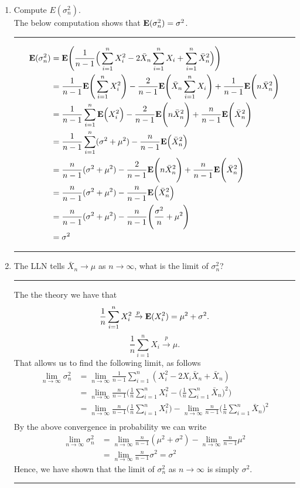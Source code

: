 \documentclass{article} %
\newcommand{\E}{{\mbox {\bf E}}}
\begin{document}
\begin{enumerate}
\item Compute $E(\sigma^2_n)$. \\
The below computation shows that $\E(\sigma^2_n)=\sigma^2$. 

\rule{\textwidth}{1pt}
\begin{align*}
\E(\sigma^2_n) &= \E\Bigg( \frac{1}{n-1}\Big(\sum_{i=1}^nX_i^2- 2\bar{X}_n\sum_{i=1}^nX_i  + \sum_{i=1}^n\bar{X}_n^2\Big)  \Bigg) \\
&=  \frac{1}{n-1} \E\Bigg(\sum_{i=1}^nX_i^2\Bigg)- \frac{2}{n-1} \E\Bigg(\bar{X}_n\sum_{i=1}^nX_i \Bigg) + \frac{1}{n-1} \E\Bigg(n\bar{X}_n^2  \Bigg) \\
&=  \frac{1}{n-1} \sum_{i=1}^n\E\Big(X_i^2\Big)- \frac{2}{n-1} \E\Bigg(n\bar{X}_n^2\Bigg) + \frac{n}{n-1} \E\Bigg(\bar{X}_n^2  \Bigg) \\
&=  \frac{1}{n-1} \sum_{i=1}^n(\sigma^2+\mu^2)- \frac{n}{n-1} \E\Big(\bar{X}_n^2\Big)  \\
&=  \frac{n}{n-1} (\sigma^2+\mu^2)- \frac{2}{n-1} \E\Bigg(n\bar{X}_n^2\Bigg) + \frac{n}{n-1} \E\Bigg(\bar{X}_n^2  \Bigg) \\
&= \frac{n}{n-1} (\sigma^2+\mu^2) - \frac{n}{n-1} \E\Big(\bar{X}_n^2\Big)  \\
&= \frac{n}{n-1} (\sigma^2+\mu^2) - \frac{n}{n-1} \Bigg(\frac{\sigma^2}{n}+\mu^2\Bigg)  \\
&= \sigma^2
\end{align*}

\rule{\textwidth}{1pt}
\item The LLN tells $\bar{X}_n\to \mu$ as $n\to\infty$, what is the limit of $\sigma^2_n$? 

\rule{\textwidth}{1pt}
The the theory we have that 
\[  \frac{1}{n}\sum_{i=1}^n X_i^2 \xrightarrow[]{p} \E(X_i^2) = \mu^2+\sigma^2. \]
\[  \frac{1}{n}\sum_{i=1}^n X_i \xrightarrow[]{p} \mu. \]
That allows us to find the following limit, as follows
\begin{align*}
\lim_{n\to\infty} \sigma^2_n &= \lim_{n\to\infty}  \frac{1}{n-1}\sum_{i=1}^n (X_i^2- 2X_i \bar{X}_n + \bar{X}_n) \\
 &= \lim_{n\to\infty}  \frac{n}{n-1}\Bigg(\frac{1}{n} \sum_{i=1}^n X_i^2   - \Bigg(\frac{1}{n}\sum_{i=1}^n \bar{X}_n\Bigg)^2\Bigg) \\
 &= \lim_{n\to\infty}  \frac{n}{n-1}\Bigg(\frac{1}{n} \sum_{i=1}^n X_i^2\Bigg)  - \lim_{n\to\infty}  \frac{n}{n-1}\Bigg(\frac{1}{n}\sum_{i=1}^n \bar{X}_n\Bigg)^2 \\
\end{align*}
By the above convergence in probability we can write 
\begin{align*}
\lim_{n\to\infty} \sigma^2_n &= \lim_{n\to\infty}  \frac{n}{n-1} (\mu^2+\sigma^2)  - \lim_{n\to\infty}  \frac{n}{n-1}\mu^2 \\
&= \lim_{n\to\infty}  \frac{n}{n-1} \sigma^2  = \sigma^2
\end{align*}
Hence, we have shown that the limit of $\sigma^2_n$ as $n\to\infty$ is simply $\sigma^2$.

\rule{\textwidth}{1pt}
\end{enumerate}
\end{document}
